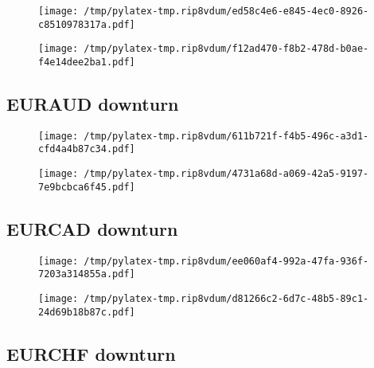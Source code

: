 \documentclass{article}%
\begin{document}
\begin{figure}[htbp]%
\centering%
\texttt{[image: /tmp/pylatex-tmp.rip8vdum/ed58c4e6-e845-4ec0-8926-c8510978317a.pdf]}%
\end{figure}

%


\begin{figure}[htbp]%
\centering%
\texttt{[image: /tmp/pylatex-tmp.rip8vdum/f12ad470-f8b2-478d-b0ae-f4e14dee2ba1.pdf]}%
\end{figure}

%
\newpage %
\subsection{EURAUD downturn}%
\label{subsec:EURAUDdownturn}%


\begin{figure}[htbp]%
\centering%
\texttt{[image: /tmp/pylatex-tmp.rip8vdum/611b721f-f4b5-496c-a3d1-cfd4a4b87c34.pdf]}%
\end{figure}

%


\begin{figure}[htbp]%
\centering%
\texttt{[image: /tmp/pylatex-tmp.rip8vdum/4731a68d-a069-42a5-9197-7e9bcbca6f45.pdf]}%
\end{figure}

%
\newpage %
\subsection{EURCAD downturn}%
\label{subsec:EURCADdownturn}%


\begin{figure}[htbp]%
\centering%
\texttt{[image: /tmp/pylatex-tmp.rip8vdum/ee060af4-992a-47fa-936f-7203a314855a.pdf]}%
\end{figure}

%


\begin{figure}[htbp]%
\centering%
\texttt{[image: /tmp/pylatex-tmp.rip8vdum/d81266c2-6d7c-48b5-89c1-24d69b18b87c.pdf]}%
\end{figure}

%
\newpage %
\subsection{EURCHF downturn}%
\label{subsec:EURCHFdownturn}%
\end{document}
